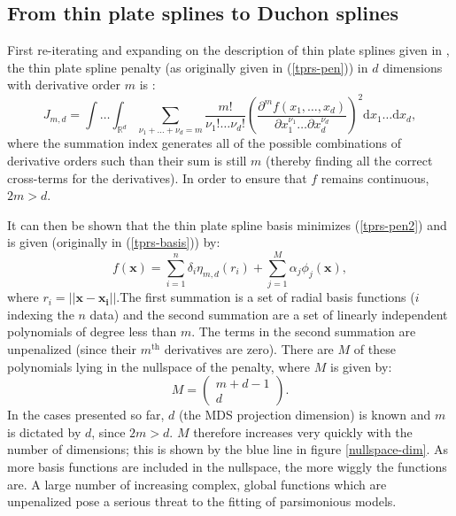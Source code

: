 \subsection{From thin plate splines to Duchon splines}
\label{gds-tprstoduchon}

First re-iterating and expanding on the description of thin plate splines given in , the thin plate spline penalty (as originally given in (\ref{tprs-pen})) in $d$ dimensions with derivative order $m$ is :
\begin{equation}
J_{m,d} = \int \ldots \int_{\mathbb{R}^d} \sum_{\nu_1 + \dots + \nu_d=m} \frac{m!}{\nu_1! \dots \nu_d!} \left( \frac{\partial^m f \left (x_1,\dots,x_d \right )}{\partial x_1^{\nu_1} \ldots  \partial x_d^{\nu_d}} \right)^2 \text{d} x_1 \ldots  \text{d} x_d,
\label{tprs-pen2}
\end{equation}
\label{cor-5s4}where the summation index generates all of the possible combinations of derivative orders such than their sum is still $m$ (thereby finding all the correct cross-terms for the derivatives). In order to ensure that $f$ remains continuous, $2m>d$.

It can then be shown that the thin plate spline basis minimizes (\ref{tprs-pen2}) and is given (originally in (\ref{tprs-basis})) by:
\begin{equation}
f(\mathbf{x}) = \sum_{i=1}^n \delta_i \eta_{m,d}(r_i) + \sum_{j=1}^M \alpha_j \phi_j(\mathbf{x}),
\label{tprs-basis2}
\end{equation}
\label{cor-5s3} where $r_i = \lvert \lvert \mathbf{x}-\mathbf{x_i}\rvert\rvert$.The first summation is a set of radial basis functions ($i$ indexing the $n$ data) and the second summation are a set of linearly independent polynomials of degree less than $m$. The terms in the second summation are unpenalized (since their $m^\text{th}$ derivatives are zero).  There are $M$ of these polynomials lying in the nullspace of the penalty, where $M$ is given by:
\begin{equation}
M=\begin{pmatrix} m+d-1 \\ d  \end{pmatrix}.
\label{gds-bigm}
\end{equation}
In the cases presented so far, $d$ (the MDS projection dimension) is known and $m$ is dictated by $d$, since $2m>d$. $M$ therefore increases very quickly with the number of dimensions; this is shown by the blue line in figure \ref{nullspace-dim}. As more basis functions are included in the nullspace, the more wiggly the functions are. A large number of increasing complex, global functions which are unpenalized pose a serious threat to the fitting of parsimonious models.

